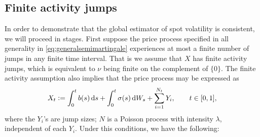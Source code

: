 \subsection{Finite activity \levy jumps}
In order to demonstrate that the global estimator of spot volatility is consistent, we will proceed in stages.  First suppose the price process specified in all generality in \eqref{eq:generalsemimartingale} experiences at most a finite number of \levy jumps in any finite time interval. That is we assume that $X$ has finite activity  \levy jumps, which is equivalent to $\nu$ being finite on the complement of   $\{0\}$. The finite activity assumption  also implies that the price process may be expressed as  
\begin{align}
  X_t :=  \int_0^t b(s) \D s + \int_0^t \sigma(s) \D W_s +  \sum^{N_t}_{ i = 1} Y_i, \qquad t \in [0,1], 
  \label{jumpfa}
\end{align}
where the $Y_i$'s are  \iid jump sizes; $N$ is a Poisson process with intensity $\lambda$, independent of each $Y_i$. Under this conditions, we have the following:

